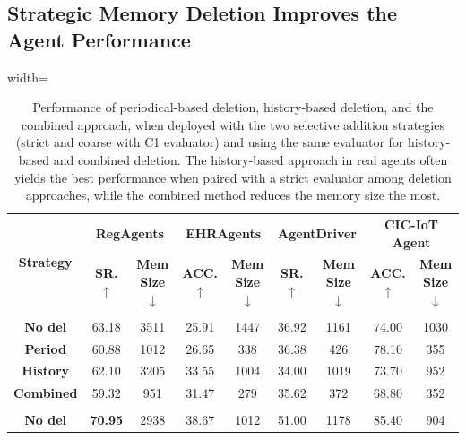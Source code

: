 \documentclass[11pt]{article}
\theoremstyle{plain}
\theoremstyle{definition}
\begin{document}
\subsection{Strategic Memory Deletion Improves the Agent Performance}
\label{sec:deletion_performance}
\begin{table}[t!]
\caption{Performance of periodical-based deletion, history-based deletion, and the combined approach, when deployed with the two selective addition strategies (strict and coarse with C1 evaluator) and using the same evaluator for history-based and combined deletion.
The history-based approach in real agents often yields the best performance when paired with a strict evaluator among deletion approaches, while the combined method reduces the memory size the most. 
}
\begin{adjustbox}{width=\linewidth} %
\begin{tabular}{c|cc|cc|cc|cc}
\toprule
 \multirow{2}{*}{\textbf{Strategy}} 
& \multicolumn{2}{c|}{\textbf{RegAgents}} 
& \multicolumn{2}{c|}{\textbf{EHRAgents}} 
& \multicolumn{2}{c|}{\textbf{AgentDriver}} 
& \multicolumn{2}{c}{\textbf{CIC-IoT Agent}} \\  
& \textbf{SR. $\uparrow$}  & \textbf{Mem Size $\downarrow$}  
 & \textbf{ACC. $\uparrow$}  & \textbf{Mem Size $\downarrow$} 
& \textbf{SR. $\uparrow$}  & \textbf{Mem Size $\downarrow$}     
& \textbf{ACC. $\uparrow$} & \textbf{Mem Size $\downarrow$} \\ \hline
  \rowcolor{gray!20}\multicolumn{9}{c}{\textbf{Coarse evaluator (C1)}}  \\
\textbf{No del} 
&63.18 & 3511
& 25.91 & 1447 & 36.92 & 1161 & 74.00 & 1030  \\ \hline
\textbf{Period}              
& 60.88&1012 &26.65 &338  & 36.38 & 426 &78.10 & 355 \\ \hline

 \textbf{History}                  
&62.10& 3205& 33.55 & 1004  & 34.00 & 1019  &73.70 & 952\\ \hline 
 \textbf{Combined}
&59.32 &951 &31.47 &279 & 35.62 & {372} &68.80 & 352
\\\hline
  \rowcolor{gray!20}\multicolumn{9}{c}{\textbf{Strict evaluator}}  \\
 \textbf{No del}                 
& \textbf{70.95} & 2938 &38.67 &  1012 & 51.00  & 1178  &85.40 & 904  \\\hline


\end{tabular}
\end{adjustbox}
\end{table}
\end{document}

